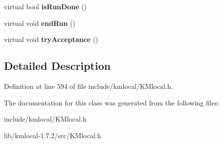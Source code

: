 \begin{DoxyCompactItemize}
\item 
\hypertarget{class_k_mlocal_hybrid_a8b078d141dae8396ccd3ee39c9073b18}{
virtual bool {\bfseries isRunDone} ()}
\label{class_k_mlocal_hybrid_a8b078d141dae8396ccd3ee39c9073b18}

\item 
\hypertarget{class_k_mlocal_hybrid_a79837d17f8e1754683c3b0d35c40911c}{
virtual void {\bfseries endRun} ()}
\label{class_k_mlocal_hybrid_a79837d17f8e1754683c3b0d35c40911c}

\item 
\hypertarget{class_k_mlocal_hybrid_a9b0ae2b6f2d3f53ac4903f1a7dc8075a}{
virtual void {\bfseries tryAcceptance} ()}
\label{class_k_mlocal_hybrid_a9b0ae2b6f2d3f53ac4903f1a7dc8075a}

\end{DoxyCompactItemize}


\subsection{Detailed Description}


Definition at line 594 of file include/kmlocal/KMlocal.h.



The documentation for this class was generated from the following files:\begin{DoxyCompactItemize}
\item 
include/kmlocal/KMlocal.h\item 
lib/kmlocal-\/1.7.2/src/KMlocal.h\end{DoxyCompactItemize}
